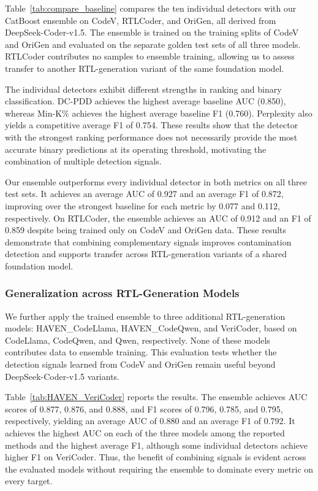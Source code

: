 Table~\ref{tab:compare_baseline} compares the ten individual detectors with our CatBoost ensemble on CodeV, RTLCoder, and OriGen, all derived from DeepSeek-Coder-v1.5. The ensemble is trained on the training splits of CodeV and OriGen and evaluated on the separate golden test sets of all three models. RTLCoder contributes no samples to ensemble training, allowing us to assess transfer to another RTL-generation variant of the same foundation model.

The individual detectors exhibit different strengths in ranking and binary classification. DC-PDD achieves the highest average baseline AUC (0.850), whereas Min-K\% achieves the highest average baseline F1 (0.760). Perplexity also yields a competitive average F1 of 0.754. These results show that the detector with the strongest ranking performance does not necessarily provide the most accurate binary predictions at its operating threshold, motivating the combination of multiple detection signals.

Our ensemble outperforms every individual detector in both metrics on all three test sets. It achieves an average AUC of 0.927 and an average F1 of 0.872, improving over the strongest baseline for each metric by 0.077 and 0.112, respectively. On RTLCoder, the ensemble achieves an AUC of 0.912 and an F1 of 0.859 despite being trained only on CodeV and OriGen data. These results demonstrate that combining complementary signals improves contamination detection and supports transfer across RTL-generation variants of a shared foundation model.

\subsubsection{Generalization across RTL-Generation Models}

We further apply the trained ensemble to three additional RTL-generation models: HAVEN\_CodeLlama, HAVEN\_CodeQwen, and VeriCoder, based on CodeLlama, CodeQwen, and Qwen, respectively. None of these models contributes data to ensemble training. This evaluation tests whether the detection signals learned from CodeV and OriGen remain useful beyond DeepSeek-Coder-v1.5 variants.

Table~\ref{tab:HAVEN_VeriCoder} reports the results. The ensemble achieves AUC scores of 0.877, 0.876, and 0.888, and F1 scores of 0.796, 0.785, and 0.795, respectively, yielding an average AUC of 0.880 and an average F1 of 0.792. It achieves the highest AUC on each of the three models among the reported methods and the highest average F1, although some individual detectors achieve higher F1 on VeriCoder. Thus, the benefit of combining signals is evident across the evaluated models without requiring the ensemble to dominate every metric on every target.

